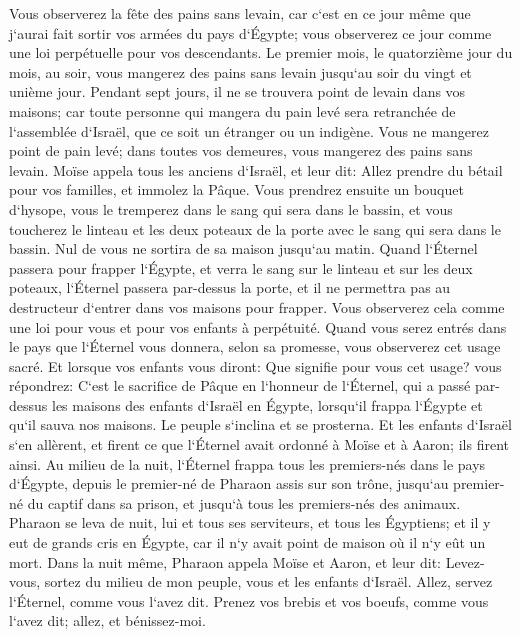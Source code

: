 \verse Vous observerez la fête des pains sans levain, car c`est en ce jour même que j`aurai fait sortir vos armées du pays d`Égypte; vous observerez ce jour comme une loi perpétuelle pour vos descendants. 
\verse Le premier mois, le quatorzième jour du mois, au soir, vous mangerez des pains sans levain jusqu`au soir du vingt et unième jour. 
\verse Pendant sept jours, il ne se trouvera point de levain dans vos maisons; car toute personne qui mangera du pain levé sera retranchée de l`assemblée d`Israël, que ce soit un étranger ou un indigène. 
\verse Vous ne mangerez point de pain levé; dans toutes vos demeures, vous mangerez des pains sans levain. 
\verse Moïse appela tous les anciens d`Israël, et leur dit: Allez prendre du bétail pour vos familles, et immolez la Pâque. 
\verse Vous prendrez ensuite un bouquet d`hysope, vous le tremperez dans le sang qui sera dans le bassin, et vous toucherez le linteau et les deux poteaux de la porte avec le sang qui sera dans le bassin. Nul de vous ne sortira de sa maison jusqu`au matin. 
\verse Quand l`Éternel passera pour frapper l`Égypte, et verra le sang sur le linteau et sur les deux poteaux, l`Éternel passera par-dessus la porte, et il ne permettra pas au destructeur d`entrer dans vos maisons pour frapper. 
\verse Vous observerez cela comme une loi pour vous et pour vos enfants à perpétuité. 
\verse Quand vous serez entrés dans le pays que l`Éternel vous donnera, selon sa promesse, vous observerez cet usage sacré. 
\verse Et lorsque vos enfants vous diront: Que signifie pour vous cet usage? 
\verse vous répondrez: C`est le sacrifice de Pâque en l`honneur de l`Éternel, qui a passé par-dessus les maisons des enfants d`Israël en Égypte, lorsqu`il frappa l`Égypte et qu`il sauva nos maisons. Le peuple s`inclina et se prosterna. 
\verse Et les enfants d`Israël s`en allèrent, et firent ce que l`Éternel avait ordonné à Moïse et à Aaron; ils firent ainsi. 
\verse Au milieu de la nuit, l`Éternel frappa tous les premiers-nés dans le pays d`Égypte, depuis le premier-né de Pharaon assis sur son trône, jusqu`au premier-né du captif dans sa prison, et jusqu`à tous les premiers-nés des animaux. 
\verse Pharaon se leva de nuit, lui et tous ses serviteurs, et tous les Égyptiens; et il y eut de grands cris en Égypte, car il n`y avait point de maison où il n`y eût un mort. 
\verse Dans la nuit même, Pharaon appela Moïse et Aaron, et leur dit: Levez-vous, sortez du milieu de mon peuple, vous et les enfants d`Israël. Allez, servez l`Éternel, comme vous l`avez dit. 
\verse Prenez vos brebis et vos boeufs, comme vous l`avez dit; allez, et bénissez-moi. 
